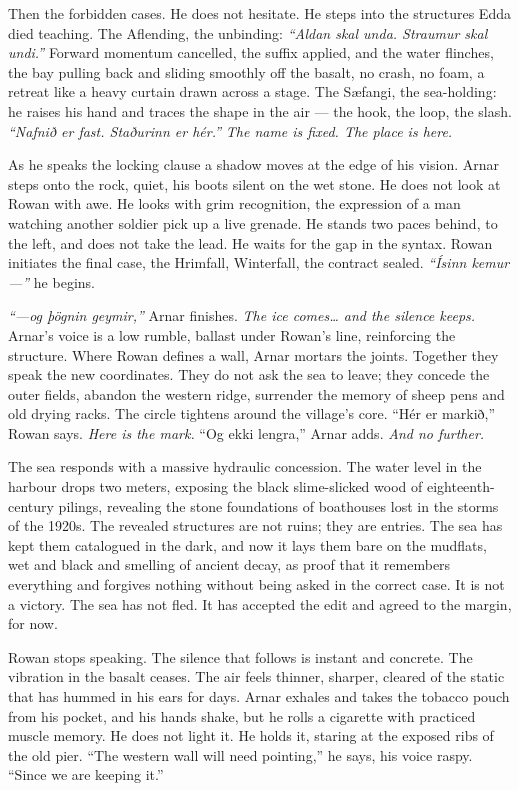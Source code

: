 \documentclass[11pt,oneside]{book}
\begin{document}
Then the forbidden cases. He does not hesitate. He steps into the
structures Edda died teaching. The Aflending, the unbinding:
\emph{``Aldan skal unda. Straumur skal undi.''} Forward momentum
cancelled, the suffix applied, and the water flinches, the bay pulling
back and sliding smoothly off the basalt, no crash, no foam, a retreat
like a heavy curtain drawn across a stage. The Sæfangi, the sea-holding:
he raises his hand and traces the shape in the air --- the hook, the
loop, the slash. \emph{``Nafnið er fast. Staðurinn er hér.''} \emph{The
name is fixed. The place is here.}

As he speaks the locking clause a shadow moves at the edge of his
vision. Arnar steps onto the rock, quiet, his boots silent on the wet
stone. He does not look at Rowan with awe. He looks with grim
recognition, the expression of a man watching another soldier pick up a
live grenade. He stands two paces behind, to the left, and does not take
the lead. He waits for the gap in the syntax. Rowan initiates the final
case, the Hrimfall, Winterfall, the contract sealed. \emph{``Ísinn
kemur---''} he begins.

\emph{``---og þögnin geymir,''} Arnar finishes. \emph{The ice
comes\ldots{} and the silence keeps.} Arnar's voice is a low rumble,
ballast under Rowan's line, reinforcing the structure. Where Rowan
defines a wall, Arnar mortars the joints. Together they speak the new
coordinates. They do not ask the sea to leave; they concede the outer
fields, abandon the western ridge, surrender the memory of sheep pens
and old drying racks. The circle tightens around the village's core.
``Hér er markið,'' Rowan says. \emph{Here is the mark.} ``Og ekki
lengra,'' Arnar adds. \emph{And no further.}

The sea responds with a massive hydraulic concession. The water level in
the harbour drops two meters, exposing the black slime-slicked wood of
eighteenth-century pilings, revealing the stone foundations of
boathouses lost in the storms of the 1920s. The revealed structures are
not ruins; they are entries. The sea has kept them catalogued in the
dark, and now it lays them bare on the mudflats, wet and black and
smelling of ancient decay, as proof that it remembers everything and
forgives nothing without being asked in the correct case. It is not a
victory. The sea has not fled. It has accepted the edit and agreed to
the margin, for now.

Rowan stops speaking. The silence that follows is instant and concrete.
The vibration in the basalt ceases. The air feels thinner, sharper,
cleared of the static that has hummed in his ears for days. Arnar
exhales and takes the tobacco pouch from his pocket, and his hands
shake, but he rolls a cigarette with practiced muscle memory. He does
not light it. He holds it, staring at the exposed ribs of the old pier.
``The western wall will need pointing,'' he says, his voice raspy.
``Since we are keeping it.''
\end{document}
